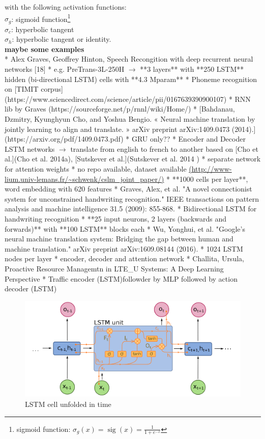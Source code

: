 with the following activation functions:\\
$\sigma_g$: sigmoid function\footnote{sigmoid function: $\sigma_g(x) = \operatorname{sig}(x) = \frac{1}{1 + e^{-x}}$}\\
$\sigma_c$: hyperbolic tangent\\
$\sigma_h$: hyperbolic tangent or identity.\\

\ifdefined\SHOWNOTES
\textbf{maybe some examples}\\
* Alex Graves, Geoffrey Hinton, Speech Recongition with deep recurrent neural networks [18]
    * e.g. PreTrans-3L-250H $\rightarrow$ **3 layers** with **250 LSTM** hidden (bi-directional LSTM) cells with **4.3 Mparam**
    * Phoneme recognition on [TIMIT corpus](https://www.sciencedirect.com/science/article/pii/0167639390900107)
    * RNN lib by Graves (https://sourceforge.net/p/rnnl/wiki/Home/)
* [Bahdanau, Dzmitry, Kyunghyun Cho, and Yoshua Bengio. « Neural machine translation by jointly learning to align and translate. » arXiv preprint arXiv:1409.0473 (2014).](https://arxiv.org/pdf/1409.0473.pdf)
    * GRU only??
    * Encoder and Decoder LSTM networks $\rightarrow$ translate from english to french to another based on [Cho et al.](Cho et al. 2014a), [Sutskever et al.](Sutskever et al. 2014 ) 
    * separate network for attention weights
    * no repo available, dataset available \url{(http://www-lium.univ-lemans.fr/~schwenk/cslm_joint_paper/)}
    * **1000 cells per layer**, word embedding with 620 features
* Graves, Alex, et al. "A novel connectionist system for unconstrained handwriting recognition." IEEE transactions on pattern analysis and machine intelligence 31.5 (2009): 855-868.
    * Bidirectional LSTM for handwriting recognition
    * **25 input neurons, 2 layers (backwards and forwards)** with **100 LSTM** blocks each
* Wu, Yonghui, et al. "Google's neural machine translation system: Bridging the gap between human and machine translation." arXiv preprint arXiv:1609.08144 (2016).
    * 1024 LSTM nodes per layer
    * encoder, decoder and attention network
* Challita, Ursula, Proactive Resource Managemtn in LTE\_U Systems: A Deep Learning Perspective
    * Traffic encoder  (LSTM)followder by MLP followed by action decoder (LSTM)

\fi

\begin{figure}[ht]
    \centering
    \includegraphics[width=\textwidth]{figures/lstm.png}
    \caption{LSTM cell unfolded in time \cite{wikimediaLstm}}
    \label{fig:lstm}
\end{figure}

